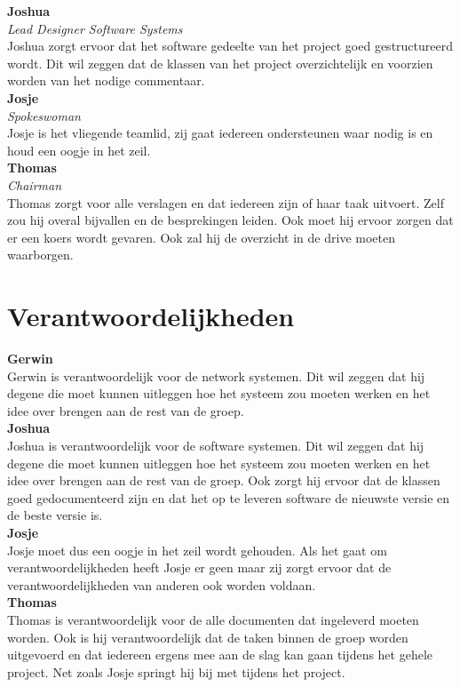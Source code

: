 \documentclass[12pt]{article}
\begin{document}
\noindent\textbf{Joshua} \\
\emph{Lead Designer Software Systems} \\
Joshua zorgt ervoor dat het software gedeelte van het project goed gestructureerd wordt. Dit wil zeggen dat de klassen van het project overzichtelijk en voorzien worden van het nodige commentaar.
\\

\noindent\textbf{Josje} \\
\emph{Spokeswoman} \\
Josje is het vliegende teamlid, zij gaat iedereen ondersteunen waar nodig is en houd een oogje in het zeil. 
\\

\noindent\textbf{Thomas} \\
\emph{Chairman} \\
Thomas zorgt voor alle verslagen en dat iedereen zijn of haar taak uitvoert. Zelf zou hij overal bijvallen en de besprekingen leiden. Ook moet hij ervoor zorgen dat er een koers wordt gevaren. Ook zal hij de overzicht in de drive moeten waarborgen.
\newpage

\section{Verantwoordelijkheden}
\textbf{Gerwin} \\
Gerwin is verantwoordelijk voor de network systemen. Dit wil zeggen dat hij degene die moet kunnen uitleggen hoe het systeem zou moeten werken en het idee over brengen aan de rest van de groep.
\\

\noindent\textbf{Joshua} \\
Joshua is verantwoordelijk voor de software systemen. Dit wil zeggen dat hij degene die moet kunnen uitleggen hoe het systeem zou moeten werken en het idee over brengen aan de rest van de groep. Ook zorgt hij ervoor dat de klassen goed gedocumenteerd zijn en dat het op te leveren software de nieuwste versie en de beste versie is.
\\

\noindent\textbf{Josje} \\
Josje moet dus een oogje in het zeil wordt gehouden. Als het gaat om verantwoordelijkheden heeft Josje er geen maar zij zorgt ervoor dat de verantwoordelijkheden van anderen ook worden voldaan.
\\

\noindent\textbf{Thomas} \\
Thomas is verantwoordelijk voor de alle documenten dat ingeleverd moeten worden. Ook is hij verantwoordelijk dat de taken binnen de groep worden uitgevoerd en dat iedereen ergens mee aan de slag kan gaan tijdens het gehele project. Net zoals Josje springt hij bij met tijdens het project.
\newpage
\end{document}

